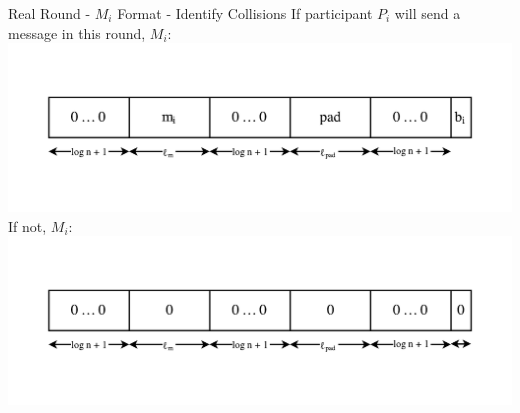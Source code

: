 \begin{frame}{Real Round - $M_i$ Format - Identify Collisions}
    \centering
    If participant $P_i$ will send a message in this round, $M_i$:
    \includegraphics[scale=.55]{images/message-format(1).pdf}\\
    If not, $M_i$:
    \includegraphics[scale=.55]{images/message-format-nomessage.pdf}
\end{frame}